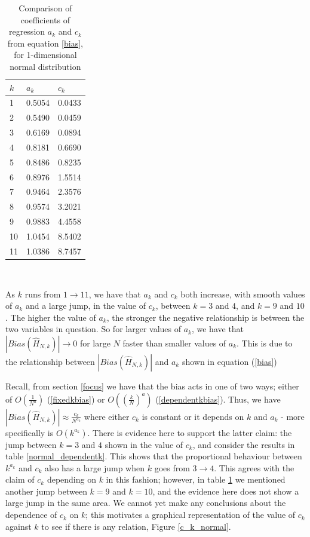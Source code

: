 \documentclass[12pt]{report}
\begin{document}
\begin{table}
\caption{Comparison of coefficients of regression $a_{k}$ and $c_{k}$ from equation \ref{bias}, for 1-dimensional normal distribution} \label{normal_a_c_compare_table}
\begin{center}
\begin{tabular}{| l | l l |} 
\toprule
$k$ &  $a_{k}$ & $c_{k}$ \\
\midrule[1pt]
1  &  0.5054 & 0.0433 \\
2  & 0.5490 & 0.0459 \\
3  & 0.6169 & 0.0894 \\
4  & 0.8181 & 0.6690 \\
5  & 0.8486 & 0.8235 \\
6  & 0.8976 & 1.5514 \\
7  & 0.9464 & 2.3576 \\
8  & 0.9574 & 3.2021 \\
9  & 0.9883 & 4.4558 \\
10 & 1.0454 & 8.5402 \\
11 & 1.0386 & 8.7457 \\
\hline
\end{tabular}
\\[10pt]
\end{center}
\end{table}

As $k$ runs from $1 \to 11$, we have that $a_{k}$ and $c_{k}$ both increase, with smooth values of $a_{k}$ and a large jump, in the value of $c_{k}$, between $k=3$ and $4$, and $k=9$ and $10$. The higher the value of $a_{k}$, the stronger the negative relationship is between the two variables in question. So for larger values of $a_{k}$, we have that $|Bias(\hat{H}_{N, k})| \to 0$ for large $N$ faster than smaller values of $a_{k}$. This is due to the relationship between $|Bias(\hat{H}_{N, k})|$ and $a_{k}$ shown in equation (\ref{bias})

Recall, from section \ref{focus} we have that the bias acts in one of two ways; either of $O \left( \frac{1}{N^{a}} \right)$ (\ref{fixedkbias}) or $O\left( \left( \frac{k}{N} \right)^{a} \right)$ (\ref{dependentkbias}). Thus, we have $|Bias(\hat{H}_{N, k})|\approx \frac{c_{k}}{N^{a_{k}}}$ where either $c_{k}$ is constant or it depends on $k$ and $a_{k}$ - more specifically is $O( k^{a_{k}})$. There is evidence here to support the latter claim: the jump between $k=3$ and $4$ shown in the value of $c_{k}$, and consider the results in table \ref{normal_dependentk}. This shows that the proportional behaviour between $k^{a_{k}}$ and $c_{k}$ also has a large jump when $k$ goes from $3 \to 4$. This agrees with the claim of $c_{k}$ depending on $k$ in this fashion; however, in table \ref{normal_a_c_compare_table} we mentioned another jump between $k=9$ and $k=10$, and the evidence here does not show a large jump in the same area. We cannot yet make any conclusions about the dependence of $c_{k}$ on $k$; this motivates a graphical representation of the value of $c_{k}$ against $k$ to see if there is any relation, Figure \ref{c_k_normal}.
\end{document}
